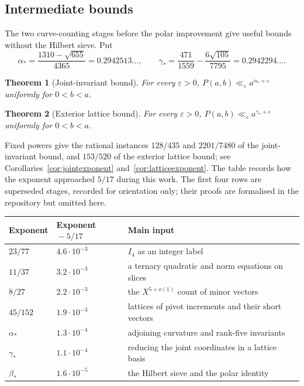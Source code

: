 \documentclass[11pt]{article}
\newtheorem{theorem}{Theorem}[section]
\theoremstyle{definition}
\theoremstyle{remark}
\begin{document}
\subsection*{Intermediate bounds}
The two curve-counting stages before the polar improvement give useful
bounds without the Hilbert sieve. Put
\[
 \alpha_* = \frac{1310-\sqrt{655}}{4365}=0.2942513\ldots,\qquad
 \gamma_* = \frac{471}{1559}-\frac{6\sqrt{105}}{7795}
          =0.2942294\ldots.
\]
\begin{theorem}[Joint-invariant bound]\label{thm:joint}
For every $\varepsilon>0$, $P(a,b)\ll_\varepsilon a^{\alpha_*+\varepsilon}$
uniformly for $0<b<a$.
\end{theorem}
\begin{theorem}[Exterior lattice bound]\label{thm:lattice}
For every $\varepsilon>0$, $P(a,b)\ll_\varepsilon a^{\gamma_*+\varepsilon}$
uniformly for $0<b<a$.
\end{theorem}
Fixed powers give the rational instances $128/435$ and $2201/7480$ of the
joint-invariant bound, and $153/520$ of the exterior lattice bound; see
Corollaries~\ref{cor:jointexponent} and~\ref{cor:latticeexponent}.
The table records how the exponent approached $5/17$ during this work. The
first four rows are superseded stages, recorded for orientation only; their
proofs are formalised in the repository but omitted here.
\begin{center}\small
\begin{tabular}{@{}lll@{}}
\toprule
Exponent & Exponent${}-5/17$ & Main input\\
\midrule
$23/77$ & $4.6\cdot10^{-3}$ & $I_4$ as an integer label\\
$11/37$ & $3.2\cdot10^{-3}$ & a ternary quadratic and norm equations on slices\\
$8/27$ & $2.2\cdot10^{-3}$ & the $X^{5+o(1)}$ count of minor vectors\\
$45/152$ & $1.9\cdot10^{-3}$ & lattices of pivot increments and their short vectors\\
$\alpha_*$ & $1.3\cdot10^{-4}$ & adjoining curvature and rank-five invariants\\
$\gamma_*$ & $1.1\cdot10^{-4}$ & reducing the joint coordinates in a lattice basis\\
$\beta_*$ & $1.6\cdot10^{-5}$ & the Hilbert sieve and the polar identity\\
\bottomrule
\end{tabular}
\end{center}
\end{document}

